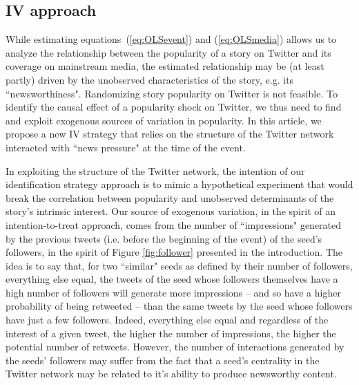 \subsection{IV approach\label{Sec:SpecificationIV}}

While estimating equations~(\ref{eq:OLSevent}) and (\ref{eq:OLSmedia}) allows us to analyze the relationship between the popularity of a story on Twitter and its coverage on mainstream media, the estimated relationship may be (at least partly) driven by the unobserved characteristics of the story, e.g. its ``newsworthiness". Randomizing story popularity on Twitter is not feasible. To identify the causal effect of a popularity shock on Twitter, we thus need to find and exploit exogenous sources of variation in popularity. In this article, we propose a new IV strategy that relies on the structure of the Twitter network interacted with ``news pressure" at the time of the event.

In exploiting the structure of the Twitter network, the intention of our identification strategy approach is to mimic a hypothetical experiment that would break the correlation between popularity and unobserved determinants of the story's intrinsic interest. Our source of exogenous variation, in the spirit of an intention-to-treat approach, comes from the number of ``impressions" generated by the previous tweets  (i.e. before the beginning of the event) of the seed's followers, in the spirit of Figure \ref{fig:follower} presented in the introduction. The idea is to say that, for two ``similar" seeds as defined by their number of followers, everything else equal, the tweets of the seed whose followers themselves have a high number of followers will generate more impressions -- and so have a higher probability of being retweeted -- than the same tweets by the seed whose followers have just a few followers.  Indeed, everything else equal and regardless of the interest of a given tweet, the higher the number of impressions, the higher the potential number of retweets. However, the number of interactions generated by the seeds' followers may suffer from the fact that a seed's centrality in the Twitter network may be related to it's ability to produce newsworthy content. 

